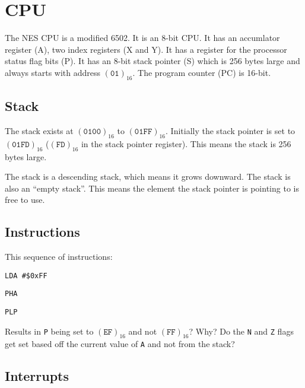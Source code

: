 %

\chapter{CPU}

The NES CPU is a modified 6502. It is an 8-bit CPU. It has an accumlator
register (A), two index registers (X and Y). It has a register for the
processor status flag bits (P). It has an 8-bit stack pointer (S) which is
256 bytes large and always starts with address $(\texttt{01})_{16}$. The
program counter (PC) is 16-bit.

\section{Stack}

The stack exists at $(\texttt{0100})_{16}$ to $(\texttt{01FF})_{16}$.
Initially the stack pointer is set to $(\texttt{01FD})_{16}$
($(\texttt{FD})_{16}$ in the stack pointer register). This means the stack is
256 bytes large.

The stack is a descending stack, which means it grows downward. The stack is
also an ``empty stack''. This means the element the stack pointer is pointing
to is free to use.


\section{Instructions}

This sequence of instructions:

\texttt{LDA \#\$0xFF}

\texttt{PHA}

\texttt{PLP}

\noindent Results in \texttt{P} being set to $(\texttt{EF})_{16}$ and not
$(\texttt{FF})_{16}$? Why? Do the \texttt{N} and \texttt{Z} flags get set
based off the current value of \texttt{A} and not from the stack?

\section{Interrupts}
